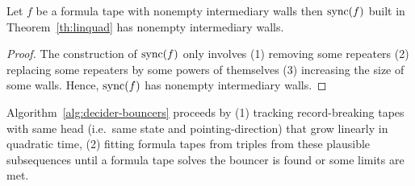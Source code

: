 \begin{lemma}\label{lem:linquad-intermediary-walls}
    Let $f$ be a formula tape with nonempty intermediary walls then $\operatorname{sync}(f)$ built in Theorem~\ref{th:linquad} has nonempty intermediary walls.
\end{lemma}
\begin{proof}
    The construction of $\operatorname{sync}(f)$ only involves (1) removing some repeaters (2) replacing some repeaters by some powers of themselves (3) increasing the size of some walls. Hence, $\operatorname{sync}(f)$ has nonempty intermediary walls.
\end{proof}

Algorithm~\ref{alg:decider-bouncers} proceeds by (1) tracking record-breaking tapes with same head (i.e.\ same state and pointing-direction) that grow linearly in quadratic time, (2) fitting formula tapes from triples from these plausible subsequences until a formula tape solves the bouncer is found or some limits are met.







